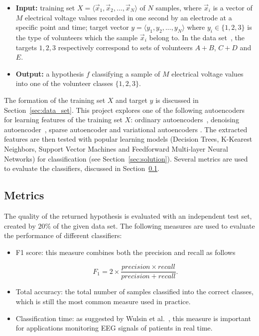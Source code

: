 \documentclass[12pt]{article}
\newcommand{\myvec}[1]{\vec{#1}}
\begin{document}
\begin{itemize}
\item \textbf{Input:} training set $X = \langle \myvec{x}_1, \myvec{x}_2, ..., \myvec{x}_N\rangle$ of $N$ samples, where $\myvec{x}_i$ is a vector of $M$ electrical voltage values recorded in one second by an electrode at a specific point and time; target vector $y = \langle y_1, y_2, ..., y_N \rangle$ where $y_i \in \{1, 2, 3\}$ is the type of volunteers which the sample $\myvec{x}_i$ belong to. In the data set~\cite{andrzejak2001indications}, the targets $1, 2, 3$ respectively correspond to sets of volunteers $A + B$, $C + D$ and $E$.
\item \textbf{Output:} a hypothesis $f$ classifying a sample of $M$ electrical voltage values into one of the volunteer classes $\{1, 2, 3\}$.
\end{itemize}

The formation of the training set $X$ and target $y$ is discussed in Section~\ref{sec:data_set}. This project explores one of the following autoencoders for learning features of the training set $X$: ordinary autoencoders~\cite{bengio2007greedy}, denoising autoencoder~\cite{vincent2010stacked}, sparse autoencoder\cite{boureau2008sparse} and variational autoencoders \cite{kingma2013auto}. The extracted features are then tested with popular learning models (Decision Trees, K-Kearest Neighbors, Support Vector Machines and Feedforward Multi-layer Neural Networks) for classification (see Section~\ref{sec:solution}). Several metrics are used to evaluate the classifiers, discussed in Section~\ref{sec:metric}.

\subsection{Metrics}
\label{sec:metric}
The quality of the returned hypothesis is evaluated with an independent test set, created by $20\%$ of the given data set. The following measures are used to evaluate the performance of different classifiers:
\begin{itemize}
\item F1 score: this measure combines both the precision and recall as follows

\[
F_1 = 2 \times \frac{precision \times recall}{precision + recall}.
\]
\item Total accuracy: the total number of samples classified into the correct classes, which is still the most common measure used in practice.
\item Classification time: as suggested by Wulsin et al.~\cite{wulsin2011modeling}, this measure is important for applications monitoring EEG signals of patients in real time.
\end{itemize}
\end{document}
